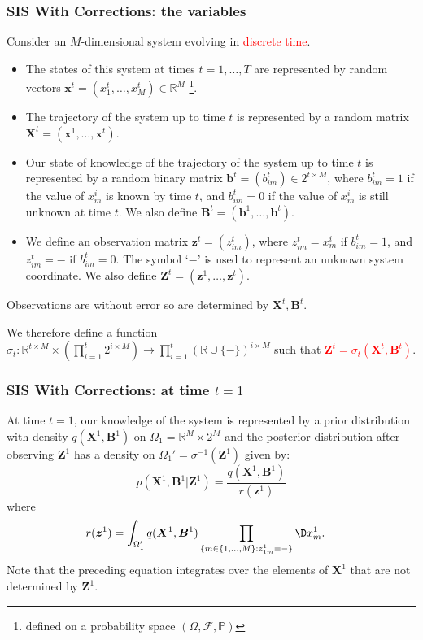 \documentclass[9pt, xcolor={dvipsnames,svgnames,table}]{beamer}
\newcommand{\F}{\mathcal{F}}
\renewcommand{\P}{\mathbb{P}}
\newcommand{\Real}{\mathbb R}
\begin{document}
\begin{frame}
    \frametitle{SIS With Corrections: the variables}
    Consider an $M$-dimensional system evolving in \textcolor{Red}{discrete time}.
    \begin{itemize}
        \item The \textcolor{PineGreen}{states of this system} at times $t = 1, \dots, T$ are represented by random vectors $\bm{x}^t = (x^t_1, \dots, x^t_M) \in \Real^M$ \footnote{defined on a probability space $(\Omega, \F, \P)$}. 
        \item The \textcolor{PineGreen}{trajectory of the system} up to time $t$ is represented by a random matrix $\bm{X}^t = (\bm{x}^1, \ldots, \bm{x}^t)$. 
        \item Our \textcolor{PineGreen}{state of knowledge of the trajectory} of the system up to time $t$ is represented by a random binary matrix $\bm{b}^t = (b^t_{im}) \in 2^{t \times M}$, where $b^t_{im} = 1$ if the value of $x^i_m$ is known by time $t$, and $b^t_{im} = 0$ if the value of $x^i_m$ is still unknown at time $t$. We also define $\bm{B}^t = (\bm{b}^1,\ldots,\bm{b}^t)$.
        \item We define an \textcolor{PineGreen}{observation matrix} $\bm{z}^t = (z^t_{im})$, where $z^t_{im} = x^i_m$ if $b^t_{im} = 1$, and $z^t_{im} = -$ if $b^t_{im} = 0$. The symbol `$-$' is used to represent an unknown system coordinate. We also define $\bm{Z}^t = (\bm{z}^1,\ldots,\bm{z}^t)$.
    \end{itemize}
Observations are without error so are determined by $\bm{X}^t, \bm{B}^t$. 

We therefore define a function $\sigma_t: \Real^{t \times M} \times \left( \prod_{i=1}^t 2^{i \times M} \right) \rightarrow \prod_{i=1}^t (\Real \cup \{ - \})^{i \times M}$ such that \textcolor{Red}{$\bm{Z}^t = \sigma_t(\bm{X}^t, \bm{B}^t)$}.
\end{frame}





\begin{frame}
    \frametitle{SIS With Corrections: at time $t=1$}
    At time $t=1$, our knowledge of the system is represented by a prior distribution with density $q(\bm{X}^1, \bm{B}^1)$ on $\Omega_1 = \Real^M \times 2^M$ and \textcolor{PineGreen}{the posterior distribution} after observing $\bm{Z}^1$ has a density on $\Omega_1' = \sigma^{-1}(\bm{Z}^1)$ given by:
    \begin{equation*}
        p(\bm{X}^1, \bm{B}^1 |\bm{Z}^1) = \frac{q(\bm{X}^1, \bm{B}^1)} {r(\bm{z}^1)} 
    \end{equation*}
    where
    \begin{align*}
        r(\bm{z}^1)  &= \int_{\Omega_1'} q(\bm{X}^1, \bm{B}^1) \prod_{ \{m \in \{1, \ldots, M \} : z^1_{1m} = - \} } \D x^1_m.
    \end{align*}
    \textcolor{PineGreen}{Note that the preceding equation integrates over the elements of $\bm{X}^1$ that are not determined by $\bm{Z}^1$}.
\end{frame}
\end{document}
